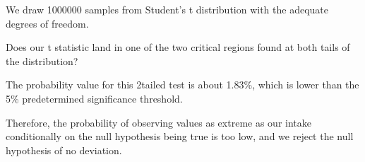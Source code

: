 \documentclass[letterpaper,10pt,english]{sphinxmanual}
\begin{document}
\begin{fulllineitems}
\sphinxAtStartPar
We draw 1000000 samples from Student’s t distribution with the adequate
degrees of freedom.

\begin{sphinxVerbatim}[commandchars=\\\{\}]
   
   
    
\end{sphinxVerbatim}

\sphinxAtStartPar
Does our t statistic land in one of the two critical regions found at
both tails of the distribution?

\begin{sphinxVerbatim}[commandchars=\\\{\}]
    
\end{sphinxVerbatim}

\sphinxAtStartPar
The probability value for this 2\sphinxhyphen{}tailed test is about 1.83\%, which is
lower than the 5\% pre\sphinxhyphen{}determined significance threshold.

\sphinxAtStartPar
Therefore, the probability of observing values as extreme as our intake
conditionally on the null hypothesis being true is too low, and we reject
the null hypothesis of no deviation.

\end{fulllineitems}

\end{document}

